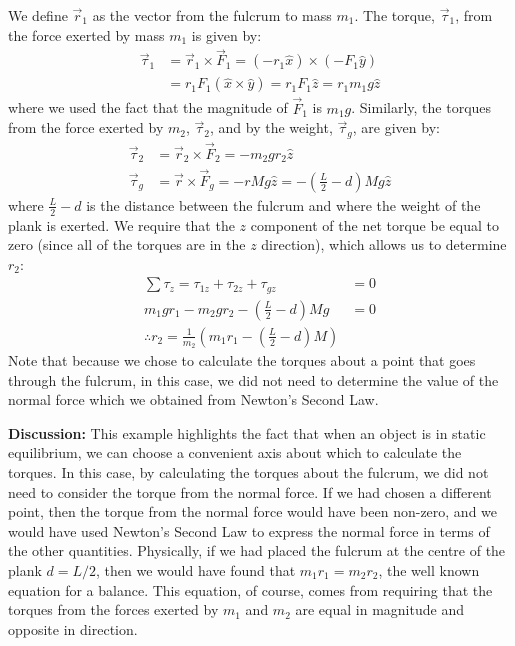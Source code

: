 \begin{framed}
\begin{framed}
We define $\vec r_1$ as the vector from the fulcrum to mass $m_1$. The torque, $\vec \tau_1$, from the force exerted by mass $m_1$ is given by:
\begin{align*}
\vec \tau_1 &= \vec r_1 \times \vec F_1 = (-r_1 \hat x) \times (-F_1 \hat y) \\
&= r_1F_1(\hat x \times \hat y) = r_1F_1\hat z=r_1m_1g\hat z
\end{align*}
where we used the fact that the magnitude of $\vec F_1$ is $m_1 g$. Similarly, the torques from the force exerted by $m_2$, $\vec\tau_2$, and by the weight, $\vec\tau_g$, are given by:
\begin{align*}
\vec \tau_2 &=\vec r_2 \times \vec F_2 = -m_2 g r_2 \hat z\\
\vec \tau_g &=\vec r \times \vec F_g=-rMg\hat z = -\left(\frac{L}{2}-d\right)Mg\hat z
\end{align*}
where $\frac{L}{2} -d$ is the distance between the fulcrum and where the weight of the plank is exerted. We require that the $z$ component of the net torque be equal to zero (since all of the torques are in the $z$ direction), which allows us to determine $r_2$:
\begin{align*}
\sum \tau_z = \tau_{1z} + \tau_{2z} + \tau_{gz} &=0\\
m_1 g r_1 -m_2 g r_2 -\left(\frac{L}{2}-d\right)Mg &=0\\
\therefore r_2 = \frac{1}{m_2} \left(m_1r_1-\left(\frac{L}{2}-d\right)M\right)
\end{align*}
Note that because we chose to calculate the torques about a point that goes through the fulcrum, in this case, we did not need to determine the value of the normal force which we obtained from Newton's Second Law.

\textbf{Discussion:} This example highlights the fact that when an object is in static equilibrium, we can choose a convenient axis about which to calculate the torques. In this case, by calculating the torques about the fulcrum, we did not need to consider the torque from the normal force. If we had chosen a different point, then the torque from the normal force would have been non-zero, and we would have used Newton's Second Law to express the normal force in terms of the other quantities. Physically, if we had placed the fulcrum at the centre of the plank $d = L/2$, then we would have found that $m_1r_1 = m_2r_2$, the well known equation for a balance. This equation, of course, comes from requiring that the torques from the forces exerted by $m_1$ and $m_2$ are equal in magnitude and opposite in direction.
\end{framed}
\end{framed}

